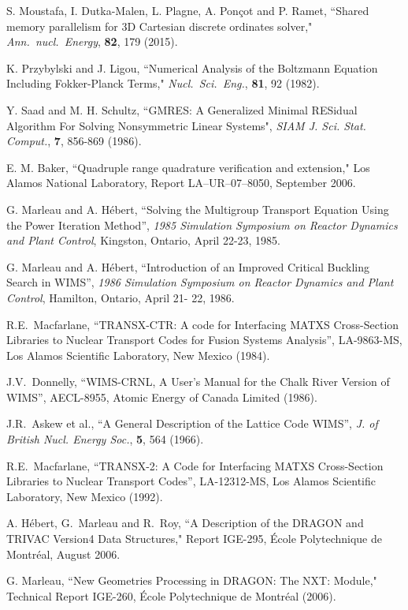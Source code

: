 \begin{thebibliography}{99}
S. Moustafa, I. Dutka-Malen, L. Plagne, A. Pon\c cot and P. Ramet, ``Shared memory parallelism for 3D Cartesian discrete ordinates solver," {\sl Ann.~nucl.~Energy}, {\bf 82}, 179 (2015).

K. Przybylski and J. Ligou, ``Numerical Analysis of the Boltzmann Equation Including Fokker-Planck Terms," {\sl Nucl.~Sci.~Eng.}, {\bf 81}, 92 (1982).

Y. Saad and M. H. Schultz, ``GMRES: A Generalized Minimal RESidual Algorithm For Solving Nonsymmetric Linear Systems", {\sl SIAM J. Sci. Stat. Comput.}, {\bf 7}, 856-869 (1986).

E. M. Baker, ``Quadruple range quadrature verification and extension," Los Alamos National Laboratory,
Report LA--UR--07--8050, September 2006.

G. Marleau and A. H\'ebert, ``Solving the Multigroup Transport Equation Using the
Power Iteration Method'',  {\sl 1985 Simulation Symposium on Reactor Dynamics and
Plant Control}, Kingston,  Ontario, April 22-23, 1985.

G. Marleau and A. H\'ebert, ``Introduction of an Improved Critical Buckling
Search in WIMS'', {\sl 1986 Simulation Symposium on Reactor Dynamics and Plant
Control}, Hamilton, Ontario, April 21- 22, 1986.

R.E.~Macfarlane, ``TRANSX-CTR: A code for Interfacing MATXS Cross-Section
Libraries to Nuclear  Transport Codes for Fusion Systems Analysis'', LA-9863-MS,
Los Alamos Scientific Laboratory, New  Mexico (1984).

J.V.~Donnelly, ``WIMS-CRNL, A User's Manual for the Chalk River Version of
WIMS'', AECL-8955,  Atomic Energy of Canada Limited (1986).

J.R.~Askew et al., ``A General Description of the Lattice Code WIMS'', {\sl J. of British Nucl. Energy Soc.}, {\bf 5}, 564 (1966).

R.E.~Macfarlane, ``TRANSX-2: A Code for Interfacing MATXS Cross-Section
Libraries to Nuclear Transport Codes'', LA-12312-MS, Los Alamos Scientific
Laboratory, New  Mexico (1992).

A. H\'ebert, G.~Marleau and R.~Roy,
``A Description of the DRAGON and TRIVAC Version4 Data Structures,"
Report IGE-295, \'Ecole Polytechnique de Montr\'eal, August 2006.

G. Marleau, ``New Geometries Processing in DRAGON: The NXT: Module," Technical Report IGE-260, \'Ecole 
Polytechnique de Montr\'eal (2006).


\end{thebibliography}
